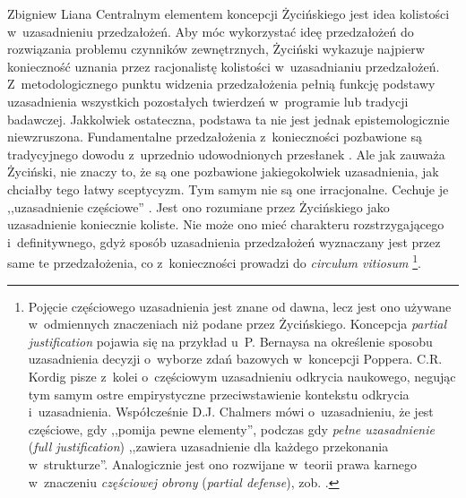 \begin{artplenv}{Zbigniew Liana}
Centralnym elementem koncepcji Życińskiego jest idea kolistości w~uzasadnieniu przedzałożeń. Aby móc wykorzystać ideę przedzałożeń do rozwiązania problemu czynników zewnętrznych, Życiński wykazuje najpierw konieczność uznania przez racjonalistę kolistości w~uzasadnianiu przedzałożeń. Z~metodologicznego punktu widzenia przedzałożenia pełnią funkcję podstawy uzasadnienia wszystkich pozostałych twierdzeń w~programie lub tradycji badawczej. Jakkolwiek ostateczna, podstawa ta nie jest jednak epistemologicznie niewzruszona. Fundamentalne przedzałożenia z~konieczności pozbawione są tradycyjnego dowodu z~uprzednio udowodnionych przesłanek
\parencite[][s.~160 przypis 1]{zycinski_teizm_1985}. %
 Ale jak zauważa Życiński, nie znaczy to, że są one pozbawione jakiegokolwiek uzasadnienia, jak chciałby tego łatwy sceptycyzm. Tym samym nie są one irracjonalne. Cechuje je ,,uzasadnienie częściowe'' 
\parencite[][s.~7.156.161.169]{zycinski_teizm_1985}. %
 Jest ono rozumiane przez Życińskiego jako uzasadnienie koniecznie koliste. Nie może ono mieć charakteru rozstrzygającego i~definitywnego, gdyż sposób uzasadnienia przedzałożeń wyznaczany jest przez same te przedzałożenia, co z~konieczności prowadzi do \textit{circulum vitiosum} 
\parencite[][s.~173 oraz 129.141.164]{zycinski_teizm_1985}%
\footnote{Pojęcie częściowego uzasadnienia jest znane od dawna, lecz jest ono używane w~odmiennych znaczeniach niż podane przez Życińskiego. Koncepcja \textit{partial justification} pojawia się na przykład u~P. Bernaysa 
\parencite*[][s.~38]{bernays_reflections_1964} %
 na określenie sposobu uzasadnienia decyzji o~wyborze zdań bazowych w~koncepcji Poppera. C.R. Kordig 
\parencite*[][s.~112]{kordig_discovery_1978} %
 pisze z~kolei o~częściowym uzasadnieniu odkrycia naukowego, negując tym samym ostre empirystyczne przeciwstawienie kontekstu odkrycia i~uzasadnienia. Współcześnie D.J. Chalmers 
\parencite*[][s.~96]{chalmers_constructing_2012} %
 mówi o~uzasadnieniu, że jest częściowe, gdy ,,pomija pewne elementy'', podczas gdy \textit{pełne uzasadnienie} (\textit{full justification}) ,,zawiera uzasadnienie dla każdego przekonania w~strukturze''. Analogicznie jest ono rozwijane w~teorii prawa karnego w~znaczeniu \textit{częściowej obrony} (\textit{partial defense}), zob. 
\parencite[][]{eldar_misguided_2014}.%
}.


\end{artplenv}
